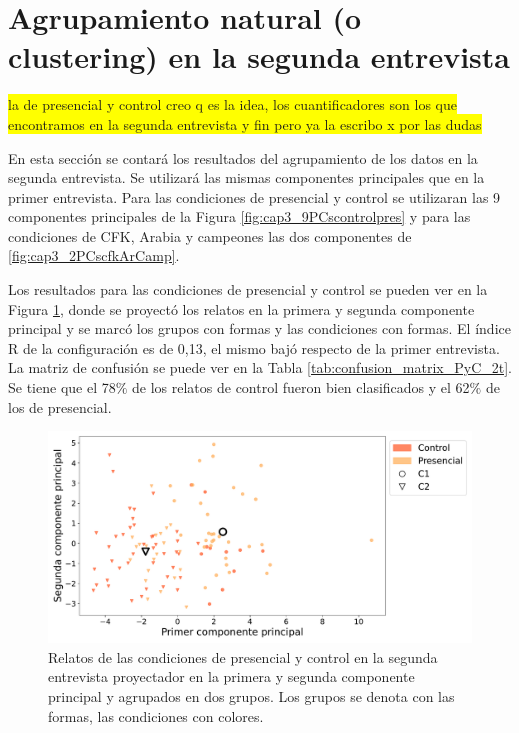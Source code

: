 \section{Agrupamiento natural (o clustering) en la segunda entrevista}

\colorbox{yellow}{la de presencial y control creo q es la idea, los cuantificadores son los que encontramos en la segunda entrevista y fin pero ya la escribo x por las dudas}

En esta sección se contará los resultados del agrupamiento de los datos en la segunda entrevista. Se utilizará las mismas componentes principales que en la primer entrevista. Para las condiciones de presencial y control se utilizaran las 9 componentes principales de la Figura \ref{fig:cap3_9PCscontrolpres} y para las condiciones de CFK, Arabia y campeones las dos componentes de \ref{fig:cap3_2PCscfkArCamp}.

Los resultados para las condiciones de presencial y control se pueden ver en la Figura \ref{fig:cap3_PC1vsPC2pres_control_segundot}, donde se proyectó los relatos en la primera y segunda componente principal y se marcó los grupos con formas y las condiciones con formas. El índice R de la configuración es de 0,13, el mismo bajó respecto de la primer entrevista. La matriz de confusión se puede ver en la Tabla \ref{tab:confusion_matrix_PyC_2t}. Se tiene que el 78$\%$ de los relatos de control fueron bien clasificados y el 62$\%$ de los de presencial.

\begin{figure}[H]
    \centering
    \includegraphics[width = 15cm]{figures/ch03/PCA_clustering/Segundo tiempo/presvscontrol_SEGUNDA_ENT_NOenespaciocosine_PC1vsPC2_markersclusters_colortemas.pdf} 
    \caption{Relatos de las condiciones de presencial y control en la segunda entrevista proyectador en la primera y segunda componente principal y agrupados en dos grupos. Los grupos se denota con las formas, las condiciones con colores.}
\label{fig:cap3_PC1vsPC2pres_control_segundot}
\end{figure}

